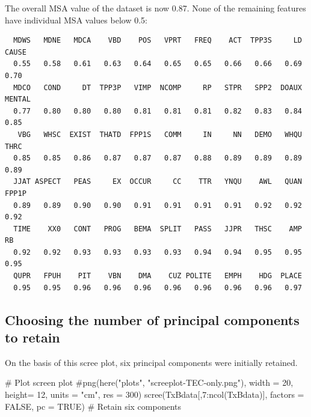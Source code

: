 \documentclass[
  letterpaper,
  DIV=11,
  numbers=noendperiod]{scrreprt}
\newenvironment{Shaded}{\begin{snugshade}}{\end{snugshade}}
\newcommand{\AttributeTok}[1]{\textcolor[rgb]{0.40,0.45,0.13}{#1}}
\newcommand{\CommentTok}[1]{\textcolor[rgb]{0.37,0.37,0.37}{#1}}
\newcommand{\ConstantTok}[1]{\textcolor[rgb]{0.56,0.35,0.01}{#1}}
\newcommand{\DecValTok}[1]{\textcolor[rgb]{0.68,0.00,0.00}{#1}}
\newcommand{\FunctionTok}[1]{\textcolor[rgb]{0.28,0.35,0.67}{#1}}
\newcommand{\NormalTok}[1]{\textcolor[rgb]{0.00,0.23,0.31}{#1}}
\newcommand{\SpecialCharTok}[1]{\textcolor[rgb]{0.37,0.37,0.37}{#1}}
\begin{document}
The overall MSA value of the dataset is now 0.87. None of the remaining
features have individual MSA values below 0.5:

\begin{Shaded}
\end{Shaded}

\begin{verbatim}
  MDWS   MDNE   MDCA    VBD    POS   VPRT   FREQ    ACT  TPP3S     LD  CAUSE 
  0.55   0.58   0.61   0.63   0.64   0.65   0.65   0.66   0.66   0.69   0.70 
  MDCO   COND     DT  TPP3P   VIMP  NCOMP     RP   STPR   SPP2  DOAUX MENTAL 
  0.77   0.80   0.80   0.80   0.81   0.81   0.81   0.82   0.83   0.84   0.85 
   VBG   WHSC  EXIST  THATD  FPP1S   COMM     IN     NN   DEMO   WHQU   THRC 
  0.85   0.85   0.86   0.87   0.87   0.87   0.88   0.89   0.89   0.89   0.89 
  JJAT ASPECT   PEAS     EX  OCCUR     CC    TTR   YNQU    AWL   QUAN  FPP1P 
  0.89   0.89   0.90   0.90   0.91   0.91   0.91   0.91   0.92   0.92   0.92 
  TIME    XX0   CONT   PROG   BEMA  SPLIT   PASS   JJPR   THSC    AMP     RB 
  0.92   0.92   0.93   0.93   0.93   0.93   0.94   0.94   0.95   0.95   0.95 
  QUPR   FPUH    PIT    VBN    DMA    CUZ POLITE   EMPH    HDG  PLACE 
  0.95   0.95   0.96   0.96   0.96   0.96   0.96   0.96   0.96   0.97 
\end{verbatim}

\subsection{Choosing the number of principal components to
retain}\label{choosing-the-number-of-principal-components-to-retain}

On the basis of this scree plot, six principal components were initially
retained.

\begin{Shaded}
\begin{Highlighting}[]
\CommentTok{\# Plot screen plot}
\CommentTok{\#png(here("plots", "screeplot{-}TEC{-}only.png"), width = 20, height= 12, units = "cm", res = 300)}
\FunctionTok{scree}\NormalTok{(TxBdata[,}\DecValTok{7}\SpecialCharTok{:}\FunctionTok{ncol}\NormalTok{(TxBdata)], }\AttributeTok{factors =} \ConstantTok{FALSE}\NormalTok{, }\AttributeTok{pc =} \ConstantTok{TRUE}\NormalTok{) }\CommentTok{\# Retain six components}
\end{Highlighting}
\end{Shaded}
\end{document}
